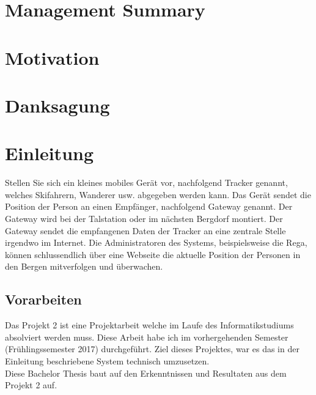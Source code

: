\documentclass[11pt,english,german]{report}
\theoremstyle{definition}
\begin{document}
\tableofcontents







\chapter*{Management Summary}

\chapter*{Motivation}

\chapter*{Danksagung}

\chapter{Einleitung}
Stellen Sie sich ein kleines mobiles Gerät vor, nachfolgend Tracker genannt, welches Skifahrern, Wanderer usw. abgegeben werden kann. Das Gerät sendet die Position der Person an einen Empfänger, nachfolgend Gateway genannt. Der Gateway wird bei der Talstation oder im nächsten Bergdorf montiert. Der Gateway sendet die empfangenen Daten der Tracker an eine zentrale Stelle irgendwo im Internet. Die Administratoren des Systems, beispielsweise die Rega, können schlussendlich über eine Webseite die aktuelle Position der Personen in den Bergen mitverfolgen und überwachen.

\section{Vorarbeiten}
Das Projekt 2 ist eine Projektarbeit welche im Laufe des Informatikstudiums absolviert werden muss. Diese Arbeit habe ich im vorhergehenden Semester (Frühlingssemester 2017) durchgeführt. Ziel dieses Projektes, war es das in der Einleitung beschriebene System technisch umzusetzen.\\[0.3cm]
Diese Bachelor Thesis baut auf den Erkenntnissen und Resultaten aus dem Projekt 2 auf.
\end{document}
